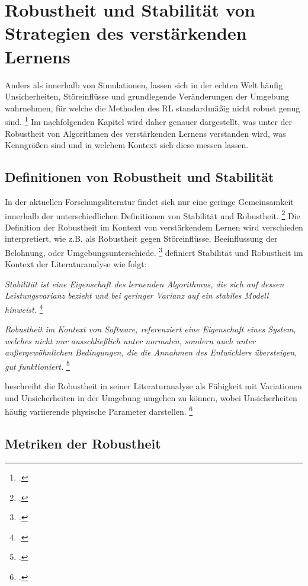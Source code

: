 \section{Robustheit und Stabilität von Strategien des verstärkenden Lernens}

Anders als innerhalb von Simulationen, lassen sich in der echten Welt häufig Unsicherheiten, Störeinflüsse und grundlegende Veränderungen der Umgebung wahrnehmen, für welche die Methoden des RL standardmäßig nicht robust genug sind. \footcite[Vgl.][S. 1]{Moos.2022}
Im nachfolgenden Kapitel wird daher genauer dargestellt, was unter der Robustheit von Algorithmen des verstärkenden Lernens verstanden wird, was Kenngrößen sind und in welchem Kontext sich diese messen lassen.

\subsection{Definitionen von Robustheit und Stabilität}

In der aktuellen Forschungsliteratur findet sich nur eine geringe Gemeinsamkeit innerhalb der unterschiedlichen Definitionen von Stabilität und Robustheit. \footcite[Vgl.][S. 5]{Pullum.2022}
Die Definition der Robustheit im Kontext von verstärkendem Lernen wird verschieden interpretiert, wie z.B. als Robustheit gegen Störeinflüsse, Beeinflussung der Belohnung, oder Umgebungsunterschiede. \footcite[Vgl.][S. 2]{Liu.2023}
\cite[]{Pullum.2022} definiert Stabilität und Robustheit im Kontext der Literaturanalyse wie folgt:

\textit{Stabilität ist eine Eigenschaft des lernenden Algorithmus, die sich auf dessen Leistungsvarianz bezieht und bei geringer Varianz auf ein stabiles Modell hinweist.} \footcite[Vgl.][S. 5]{Pullum.2022}

\textit{Robustheit im Kontext von Software, referenziert eine Eigenschaft eines System, welches nicht nur ausschließlich unter normalen, sondern auch unter außergewöhnlichen Bedingungen, die die Annahmen des Entwicklers übersteigen, gut funktioniert.} \footcite[Vgl.][S. 5]{Pullum.2022}

\cite[]{Moos.2022} beschreibt die Robustheit in seiner Literaturanalyse als Fähigkeit mit Variationen und Unsicherheiten in der Umgebung umgehen zu können, wobei Unsicherheiten häufig variierende physische Parameter darstellen. \footcite[Vgl.][S. 1]{Moos.2022}

\subsection{Metriken der Robustheit}

